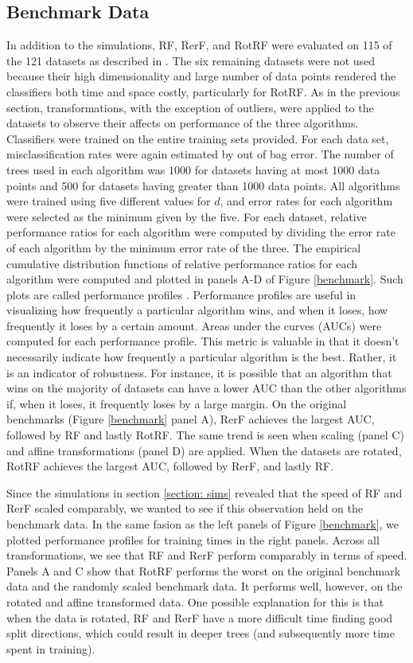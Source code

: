 \documentclass[10pt]{article}
\begin{document}
\subsection{Benchmark Data}
\label{section: benchmark}

In addition to the simulations, RF, RerF, and RotRF were evaluated on 115 of the 121 datasets as described in \cite{Delgado2014}. The six remaining datasets were not used because their high dimensionality and large number of data points rendered the classifiers both time and space costly, particularly for RotRF. As in the previous section, transformations, with the exception of outliers, were applied to the datasets to observe their affects on performance of the three algorithms. Classifiers were trained on the entire training sets provided. For each data set, misclassification rates were again estimated by out of bag error. The number of trees used in each algorithm was 1000 for datasets having at most 1000 data points and 500 for datasets having greater than 1000 data points. All algorithms were trained using five different values for $d$, and error rates for each algorithm were selected as the minimum given by the five. For each dataset, relative performance ratios for each algorithm were computed by dividing the error rate of each algorithm by the minimum error rate of the three. The empirical cumulative distribution functions of relative performance ratios for each algorithm were computed and plotted in panels A-D of Figure \ref{benchmark}. Such plots are called performance profiles \cite{Dolan2002}. Performance profiles are useful in visualizing how frequently a particular algorithm wins, and when it loses, how frequently it loses by a certain amount. Areas under the curves (AUCs) were computed for each performance profile. This metric is valuable in that it doesn't necessarily indicate how frequently a particular algorithm is the best. Rather, it is an indicator of robustness. For instance, it is possible that an algorithm that wins on the majority of datasets can have a lower AUC than the other algorithms if, when it loses, it frequently loses by a large margin. On the original benchmarks (Figure \ref{benchmark} panel A), RerF achieves the largest AUC, followed by RF and lastly RotRF. The same trend is seen when scaling (panel C) and affine transformations (panel D) are applied. When the datasets are rotated, RotRF achieves the largest AUC, followed by RerF, and lastly RF.

Since the simulations in section \ref{section: sims} revealed that the speed of RF and RerF scaled comparably, we wanted to see if this observation held on the benchmark data. In the same fasion as the left panels of Figure \ref{benchmark}, we plotted performance profiles for training times in the right panels. Across all transformations, we see that RF and RerF perform comparably in terms of speed. Panels A and C show that RotRF performs the worst on the original benchmark data and the randomly scaled benchmark data. It performs well, however, on the rotated and affine transformed data. One possible explanation for this is that when the data is rotated, RF and RerF have a more difficult time finding good split directions, which could result in deeper trees (and subsequently more time spent in training).  
\end{document}
